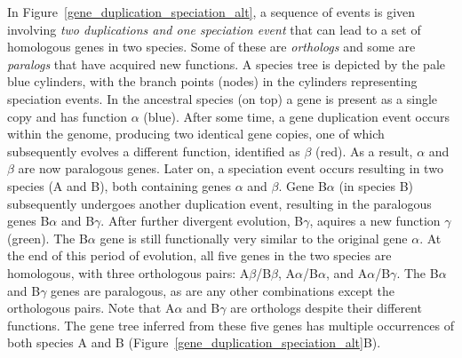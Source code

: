 In Figure~\ref{gene_duplication_speciation_alt}, a sequence of events is given involving \textit{two duplications and one speciation event} that can lead to a set of homologous genes in two species.
Some of these are \textit{orthologs} and some are \textit{paralogs} that have acquired new functions.
A species tree is depicted by the pale blue cylinders, with the branch points (nodes) in the cylinders representing speciation events.
In the ancestral species (on top) a gene is present as a single copy and has function $\alpha$ (blue).
After some time, a gene duplication event occurs within the genome, producing two identical gene copies, one of which subsequently evolves a different function, identified as $\beta$ (red).
As a result, $\alpha$ and $\beta$ are now paralogous genes.
Later on, a speciation event occurs resulting in two species (A and B), both containing genes $\alpha$ and $\beta$.
Gene B$\alpha$ (in species B) subsequently undergoes another duplication event, resulting in the paralogous genes B$\alpha$ and B$\gamma$.
After further divergent evolution, B$\gamma$, aquires a new function $\gamma$ (green).
The B$\alpha$ gene is still functionally very similar to the original gene $\alpha$.
At the end of this period of evolution, all five genes in the two species are homologous, with three orthologous pairs: A$\beta$/B$\beta$, A$\alpha$/B$\alpha$, and A$\alpha$/B$\gamma$.
The B$\alpha$ and B$\gamma$ genes are paralogous, as are any other combinations except the orthologous pairs.
Note that A$\alpha$ and B$\gamma$ are orthologs despite their different functions.
The gene tree inferred from these five genes has multiple occurrences of both species A and B (Figure~\ref{gene_duplication_speciation_alt}B).

% 

